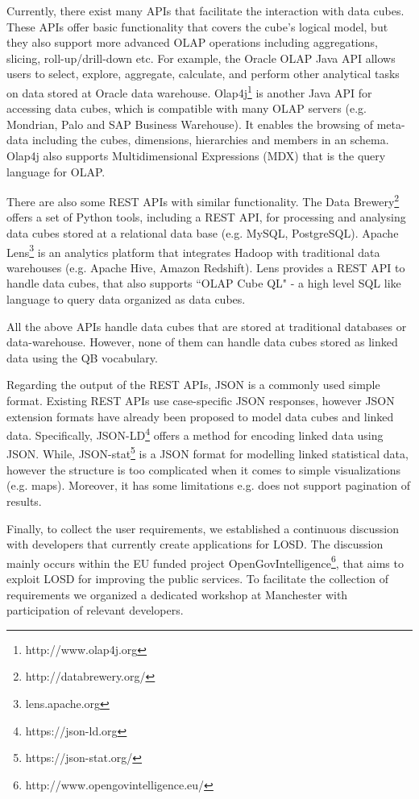 \documentclass{llncs}
\begin{document}
Currently, there exist many APIs that facilitate the interaction with data cubes. These APIs offer basic functionality that covers the cube's logical model, but they also support more advanced OLAP operations including aggregations, slicing, roll-up/drill-down etc. For example, the Oracle OLAP Java API \cite{ORACLEAPI} allows users to select, explore, aggregate, calculate, and perform other analytical tasks on data stored at Oracle data warehouse. Olap4j\footnote{http://www.olap4j.org} is another Java API for accessing data cubes, which is compatible with many OLAP servers (e.g. Mondrian, Palo and SAP Business Warehouse). It enables the browsing of meta-data including the cubes, dimensions, hierarchies and members in an schema. Olap4j also supports Multidimensional Expressions (MDX) that is the query language for OLAP.

There are also some REST APIs with similar functionality. The Data Brewery\footnote{http://databrewery.org/} offers a set of Python tools, including a REST API, for processing and analysing data cubes stored at a relational data base (e.g. MySQL, PostgreSQL). Apache Lens\footnote{lens.apache.org} is an analytics platform that integrates Hadoop with traditional data warehouses (e.g. Apache Hive, Amazon Redshift). Lens provides a REST API to handle data cubes, that also supports ``OLAP Cube QL" - a high level SQL like language to query data organized as data cubes.

All the above APIs handle data cubes that are stored at traditional databases or data-warehouse. However, none of them can handle data cubes  stored as linked data using the QB vocabulary.  

Regarding the output of the REST APIs, JSON is a commonly used simple format. Existing REST APIs use 
case-specific JSON responses, however JSON extension formats have already been proposed to model data cubes and linked data. Specifically, JSON-LD\footnote{https://json-ld.org} offers a method for encoding linked data using JSON. While, JSON-stat\footnote{https://json-stat.org/} is a JSON format for modelling linked statistical data, however the structure is too complicated when it comes to simple visualizations (e.g. maps). Moreover, it has some limitations e.g. does not support pagination of results. 

Finally, to collect the user requirements, we established a continuous discussion with developers that currently create applications for LOSD. The discussion mainly occurs within the EU funded project OpenGovIntelligence\footnote{http://www.opengovintelligence.eu/}, that aims to exploit LOSD for improving the public services. To facilitate the collection of requirements we organized a dedicated workshop at Manchester with participation of relevant developers. 
\end{document}

